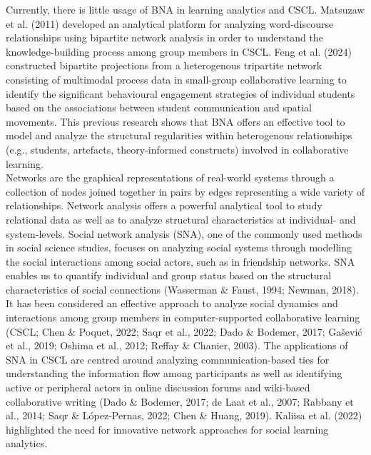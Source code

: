 Currently, there is little usage of BNA in learning analytics and CSCL. Matsuzaw et al. (2011) developed an analytical platform for analyzing word-discourse relationships using bipartite network analysis in order to understand the knowledge-building process among group members in CSCL. Feng et al. (2024) constructed bipartite projections from a heterogenous tripartite network consisting of multimodal process data in small-group collaborative learning to identify the significant behavioural engagement strategies of individual students based on the associations between student communication and spatial movements. This previous research shows that BNA offers an effective tool to model and analyze the structural regularities within heterogenous relationships (e.g., students, artefacts, theory-informed constructs) involved in collaborative learning.\\

Networks are the graphical representations of real-world systems through a collection of nodes joined together in pairs by edges representing a wide variety of relationships. Network analysis offers a powerful analytical tool to study relational data as well as to analyze structural characteristics at individual- and system-levels. Social network analysis (SNA), one of the commonly used methods in social science studies, focuses on analyzing social systems through modelling the social interactions among social actors, such as in friendship networks. SNA enables us to quantify individual and group status based on the structural characteristics of social connections (Wasserman \& Faust, 1994; Newman, 2018). It has been considered an effective approach to analyze social dynamics and interactions among group members in computer-supported collaborative learning (CSCL; Chen \& Poquet, 2022; Saqr et al., 2022; Dado \& Bodemer, 2017; Gašević et al., 2019; Oshima et al., 2012; Reffay \& Chanier, 2003). The applications of SNA in CSCL are centred around analyzing communication-based ties for understanding the information flow among participants as well as identifying active or peripheral actors in online discussion forums and wiki-based collaborative writing (Dado \& Bodemer, 2017; de Laat et al., 2007; Rabbany et al., 2014; Saqr \& López-Pernas, 2022; Chen \& Huang, 2019). Kaliisa et al. (2022) highlighted the need for innovative network approaches for social learning analytics.\\

